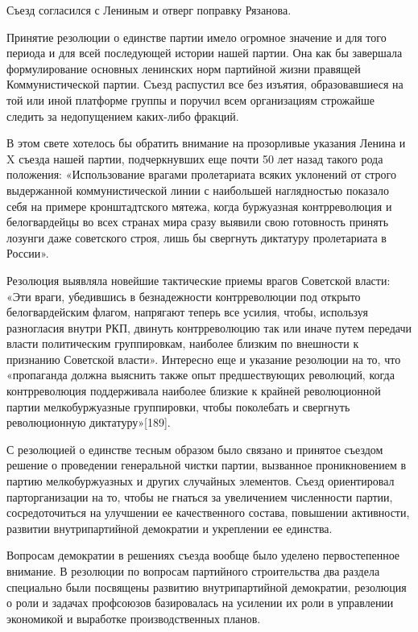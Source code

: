 \documentclass[12pt, a4paper, openany]{book}
\begin{document}
Съезд согласился с Лениным и отверг поправку Рязанова.

Принятие резолюции о единстве партии имело огромное значение и для того периода и для всей последующей истории нашей партии. Она как бы завершала формулирование основных ленинских норм партийной жизни правящей Коммунистической партии. Съезд распустил все без изъятия, образовавшиеся на той или иной платформе группы и поручил всем организациям строжайше следить за недопущением каких-либо фракций.

В этом свете хотелось бы обратить внимание на прозорливые указания Ленина и X съезда нашей партии, подчеркнувших еще почти 50 лет назад такого рода положения: «Использование врагами пролетариата всяких уклонений от строго выдержанной коммунистической линии с наибольшей наглядностью показало себя на примере кронштадтского мятежа, когда буржуазная контрреволюция и белогвардейцы во всех странах мира сразу выявили свою готовность принять лозунги даже советского строя, лишь бы свергнуть диктатуру пролетариата в России».

Резолюция выявляла новейшие тактические приемы врагов Советской власти: «Эти враги, убедившись в безнадежности контрреволюции под открыто белогвардейским флагом, напрягают теперь все усилия, чтобы, используя разногласия внутри РКП, двинуть контрреволюцию так или иначе путем передачи власти политическим группировкам, наиболее близким по внешности к признанию Советской власти». Интересно еще и указание резолюции на то, что «пропаганда должна выяснить также опыт предшествующих революций, когда контрреволюция поддерживала наиболее близкие к крайней революционной партии мелкобуржуазные группировки, чтобы поколебать и свергнуть революционную диктатуру»[189].

С резолюцией о единстве тесным образом было связано и принятое съездом решение о проведении генеральной чистки партии, вызванное проникновением в партию мелкобуржуазных и других случайных элементов. Съезд ориентировал парторганизации на то, чтобы не гнаться за увеличением численности партии, сосредоточиться на улучшении ее качественного состава, повышении активности, развитии внутрипартийной демократии и укреплении ее единства.

Вопросам демократии в решениях съезда вообще было уделено первостепенное внимание. В резолюции по вопросам партийного строительства два раздела специально были посвящены развитию внутрипартийной демократии, резолюция о роли и задачах профсоюзов базировалась на усилении их роли в управлении экономикой и выработке производственных планов.
\end{document}
